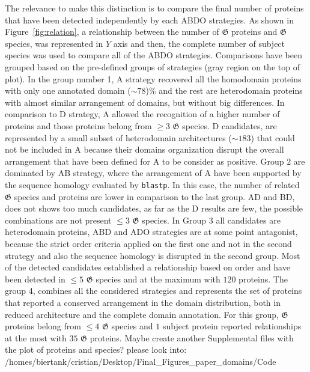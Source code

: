 \documentclass[11pt]{article}
\newcommand{\TODO}[1]{\begingroup\color{red}#1\endgroup}
\begin{document}
The relevance to make this distinction is to compare the final number of
proteins that have been detected independently by each ABDO strategies. As shown
in Figure~\ref{fig:relation}, a relationship between the number of
$\boldsymbol{\mathfrak{G}}$ proteins and $\boldsymbol{\mathfrak{G}}$ species,
was represented in $Y$ axis and then, the complete number of subject species was
used to compare all of the ABDO strategies. Comparisons have been grouped based
on the pre-defined groups of strategies (gray region on the top of plot). In the
group number 1, A strategy recovered all the homodomain proteins with only one
annotated domain ($\sim 78$)\% and the rest are heterodomain proteins with
almost similar arrangement of domains, but without big differences. In
comparison to D strategy, A allowed the recognition of a higher number of proteins and
those proteins belong from $\geq 3$ $\boldsymbol{\mathfrak{G}}$ species. D
candidates, are represented by a small subset of heterodomain architectures
($\sim 183$) that could not be included in A because their domains organization
disrupt the overall arrangement that have been defined for A to be consider as
positive. 
Group $2$ are dominated by AB strategy, where the arrangement of A have been
supported by the sequence homology evaluated by \texttt{blastp}. In this case,
the number of related $\boldsymbol{\mathfrak{G}}$ species and proteins are lower
in comparison to the last group. AD and BD, does not shows too much candidates,
as far as the D results are few, the possible combinations are not present $\leq 3$ 
$\boldsymbol{\mathfrak{G}}$ species. In Group $3$ all candidates are heterodomain proteins,
ABD and ADO strategies are at some point antagonist, because the strict order 
criteria applied on the first one and not in the second strategy and also the sequence 
homology is disrupted in the second group. Most of the detected candidates established 
a relationship based on order and have been detected in $\leq 5$
$\boldsymbol{\mathfrak{G}}$ species and at the maximum with $120$ proteins. The
group 4, combines all the considered strategies and represents the set of
proteins that reported a conserved arrangement in the domain distribution, both
in reduced architecture and the complete domain annotation. For this group,
$\boldsymbol{\mathfrak{G}}$ proteins belong from $\leq 4$
$\boldsymbol{\mathfrak{G}}$ species and $1$ subject protein reported
relationships at the most with $35$ $\boldsymbol{\mathfrak{G}}$ proteins.
\TODO{Maybe create another Supplemental files with the plot of proteins and
  species? please look into:
/homes/biertank/cristian/Desktop/Final\_Figures\_paper\_domains/Code}
\end{document}
